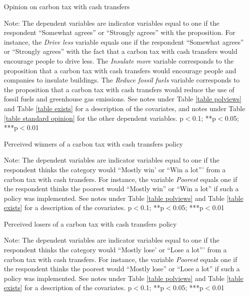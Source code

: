 \documentclass{article}
\begin{document}
\begin{table}[h!]
	\caption{Opinion on carbon tax with cash transfers}
	\begin{center}
		\scalebox{0.7}{}
	\end{center}
	{\footnotesize Note: The dependent variables are indicator variables equal to one if the respondent ``Somewhat agrees'' or ``Strongly agrees'' with the proposition. For instance, the \textit{Drive less} variable equals one if the respondent ``Somewhat agrees'' or ``Strongly agrees'' with the fact that a carbon tax with cash transfers would encourage people to drive less. The \textit{Insulate more} variable corresponds to the proposition that a carbon tax with cash transfers would encourage people and companies to insulate buildings. The \textit{Reduce fossil fuels} variable corresponds to the proposition that a carbon tax with cash transfers would reduce the use of fossil fuels and greenhouse gas emissions. See notes under Table \ref{table polviews} and Table \ref{table exists} for a description of the covariates, and notes under Table \ref{table standard opinion} for the other dependent variables.
	\newline *p$<$0.1; **p$<$0.05; ***p$<$0.01}
\end{table}	

\begin{table}[h!]
	\caption{Perceived winners of a carbon tax with cash transfers policy}
	\begin{center}
		\scalebox{0.7}{}
	\end{center}
	{\footnotesize Note: The dependent variables are indicator variables equal to one if the respondent thinks the category would ``Mostly win' or ``Win a lot''' from a carbon tax with cash transfers. For instance, the variable \textit{Poorest} equals one if the respondent thinks the poorest would ``Mostly win'' or ``Win a lot'' if such a policy was implemented. See notes under Table \ref{table polviews} and Table \ref{table exists} for a description of the covariates.
	\newline *p$<$0.1; **p$<$0.05; ***p$<$0.01}
\end{table}	

\begin{table}[h!]
	\caption{Perceived losers of a carbon tax with cash transfers policy}
	\begin{center}
		\scalebox{0.7}{}
	\end{center}
	{\footnotesize Note: The dependent variables are indicator variables equal to one if the respondent thinks the category would ``Mostly lose' or ``Lose a lot''' from a carbon tax with cash transfers. For instance, the variable \textit{Poorest} equals one if the respondent thinks the poorest would ``Mostly lose'' or ``Lose a lot'' if such a policy was implemented. See notes under Table \ref{table polviews} and Table \ref{table exists} for a description of the covariates.
	\newline *p$<$0.1; **p$<$0.05; ***p$<$0.01}
\end{table}	
\end{document}
